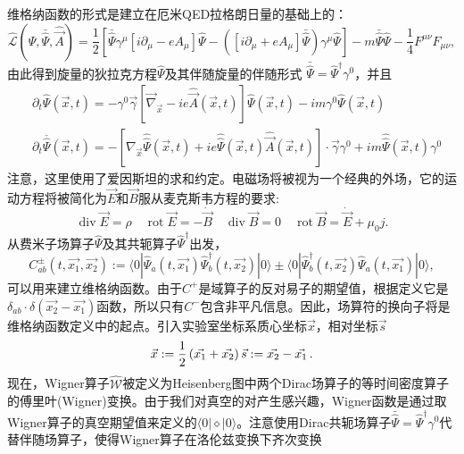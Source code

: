 维格纳函数的形式是建立在厄米QED拉格朗日量的基础上的：
\begin{equation}
    \mathcal{\hat{L}}(\hat{\Psi},\bar{\hat{\Psi } },\hat{\overrightarrow{A} } ) = \frac12\left[\bar{\hat{\Psi }}\gamma^\mu [i \partial_\mu-eA_\mu]\hat{\Psi}-\left([i\partial_\mu+eA_\mu]\bar{\hat{\Psi }}\right)\gamma^\mu\hat{\Psi}\right]-m\bar{\hat{\Psi }}\hat{\Psi}-\frac14F^{\mu\nu}F_{\mu\nu},
\end{equation}
由此得到旋量的狄拉克方程$\hat{\Psi}$及其伴随旋量的伴随形式 $\bar{\hat{\Psi}}=\hat{\Psi}^\dagger\gamma^0$，并且
\begin{equation}
\begin{aligned}
&\partial_{t} \hat{\Psi}(\vec{x}, t)=-\gamma^{0} \vec{\gamma}\left[\vec{\nabla}_{\vec{x}}-i e \hat{\vec{A}}(\vec{x}, t)\right] \hat{\Psi}(\vec{x}, t)-i m \gamma^{0} \hat{\Psi}(\vec{x}, t) \\
&\partial_{t} \overline{\hat{\Psi}}(\vec{x}, t)=-\left[\nabla_{\vec{x}} \hat{\hat{\Psi}}(\vec{x}, t)+i e \hat{\hat{\Psi}}(\vec{x}, t) \hat{\vec{A}}(\vec{x}, t)\right] \cdot \vec{\gamma} \gamma^{0}+i m \hat{\hat{\Psi}}(\vec{x}, t) \gamma^{0}
\end{aligned}        
\end{equation}
注意，这里使用了爱因斯坦的求和约定。电磁场将被视为一个经典的外场，它的运动方程将被简化为$\vec{E}$和$\vec{B}$服从麦克斯韦方程的要求:
\begin{equation}
\operatorname{div} \vec{E} = \rho \quad \operatorname{rot} \vec{E} = -\dot{\vec{B}} \quad
\operatorname{div} \vec{B} = 0 \quad \operatorname{rot} \vec{B} = \dot{\vec{E}}+\mu_{0} j .
\end{equation}
从费米子场算子$\hat{\Psi}$及其共轭算子$\hat{\Psi}^\dagger$出发，
\begin{equation}
C_{ab}^{\pm}(t,\vec{x_{1}},\vec{x_{2}}):=\langle0|\hat{\Psi}_{a}(t,\vec{x_{1}})\hat{\Psi}_{b}^{\dagger}(t,\vec{x_{2}})|0\rangle\pm\langle0|\hat{\Psi}_{b}^{\dagger}(t,\vec{x_{2}})\hat{\Psi}_{a}(t,\vec{x_{1}})|0\rangle,
\end{equation}
可以用来建立维格纳函数。由于$C^+$是域算子的反对易子的期望值，根据定义它是$\delta_{ab}\cdot\allowbreak\delta(\vec{x_2}-\vec{x_1})$函数，所以只有$C^-$包含非平凡信息。因此，场算符的换向子将是维格纳函数定义中的起点。引入实验室坐标系质心坐标$\vec{x}$，相对坐标$\vec{s}$ 
\begin{equation}
     \vec{x} : =  \frac12\left( \vec{x_1} + \vec{x_2} \right) \\
  \vec{s} : = \vec{x_2} - \vec{x_1}\,.
\end{equation}
现在，Wigner算子$\hat{\mathcal{W}}$被定义为Heisenberg图中两个Dirac场算子的等时间密度算子的傅里叶(Wigner)变换。由于我们对真空的对产生感兴趣，Wigner函数是通过取Wigner算子的真空期望值来定义的$\langle0|\diamond|0\rangle $。注意使用Dirac共轭场算子$\bar{\hat{\Psi} }=\hat{\Psi}^\dagger\gamma^0$代替伴随场算子，使得Wigner算子在洛伦兹变换下齐次变换

